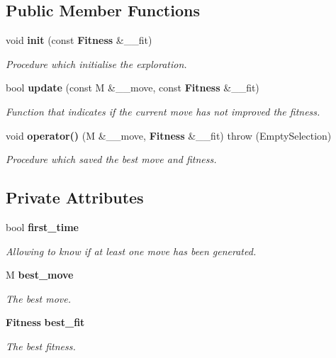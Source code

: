\subsection*{Public Member Functions}
\begin{CompactItemize}
\item 
void {\bf init} (const {\bf Fitness} \&\_\-\_\-fit)\label{classmo_best_impr_select_2d2abf9aa17dc77cbb4f41810ab7b956}

\begin{CompactList}\small\item\em Procedure which initialise the exploration. \item\end{CompactList}\item 
bool {\bf update} (const M \&\_\-\_\-move, const {\bf Fitness} \&\_\-\_\-fit)
\begin{CompactList}\small\item\em Function that indicates if the current move has not improved the fitness. \item\end{CompactList}\item 
void {\bf operator()} (M \&\_\-\_\-move, {\bf Fitness} \&\_\-\_\-fit)  throw (Empty\-Selection)
\begin{CompactList}\small\item\em Procedure which saved the best move and fitness. \item\end{CompactList}\end{CompactItemize}
\subsection*{Private Attributes}
\begin{CompactItemize}
\item 
bool {\bf first\_\-time}\label{classmo_best_impr_select_352b14d206b0772eb9f40efb7beb0f13}

\begin{CompactList}\small\item\em Allowing to know if at least one move has been generated. \item\end{CompactList}\item 
M {\bf best\_\-move}\label{classmo_best_impr_select_bd86f70519f954c07ff0d8a2a3a8ff6a}

\begin{CompactList}\small\item\em The best move. \item\end{CompactList}\item 
{\bf Fitness} {\bf best\_\-fit}\label{classmo_best_impr_select_dcac897424b5805f146bb1dbb429f2fe}

\begin{CompactList}\small\item\em The best fitness. \item\end{CompactList}\end{CompactItemize}


